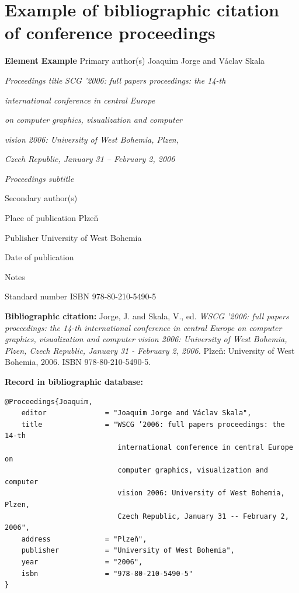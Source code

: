 \newpage
\section*{Example of bibliographic citation of conference proceedings}
\label{pr-sbornik}
\begin{tabbing}
\zarazky
\textbf{Element} \> \textbf{Example} \odradkovani
Primary author(s) \>
Joaquim {\sc Jorge} and Václav {\sc Skala}

\odradkovani
{\em Proceedings title} \>
{\em SCG ’2006: full papers proceedings: the 14-th}

    \odradkovani \>
    {\em international conference in central Europe}
    
    \odradkovani \>
    {\em on computer graphics, visualization and computer}
    
    \odradkovani \>
    {\em vision 2006: University of West Bohemia, Plzen,}

    \odradkovani \>
    {\em Czech Republic, January 31 -- February 2, 2006}

\odradkovani
{\em Proceedings subtitle}\footnotemark[1]

\odradkovani
Secondary author(s)\footnotemark[1] \>

\odradkovani
Place of publication \>
Plzeň

\odradkovani
Publisher \>
University of West Bohemia

\odradkovani
Date of publication 

\odradkovani
Notes\footnotemark[2] \>

\odradkovani
Standard number \>
ISBN 978-80-210-5490-5

\odradkovani
\end{tabbing}

\noindent \textbf{Bibliographic citation:} \odradkovani
{\sc Jorge}, J. and {\sc Skala}, V., ed. {\em WSCG ’2006: full papers proceedings: the 14-th
international conference in central Europe on computer graphics, visualization and
computer vision 2006: University of West Bohemia, Plzen, Czech Republic, January
31 - February 2, 2006.} Plzeň: University of West Bohemia, 2006. ISBN
978-80-210-5490-5.

\bigskip \bigskip
\noindent \textbf{Record in bibliographic database:}
\vspace{-0.5em}
\begin{verbatim}
@Proceedings{Joaquim,
    editor              = "Joaquim Jorge and Václav Skala",
    title               = "WSCG ’2006: full papers proceedings: the 14-th 
                           international conference in central Europe on 
                           computer graphics, visualization and computer 
                           vision 2006: University of West Bohemia, Plzen, 
                           Czech Republic, January 31 -- February 2, 2006",
    address             = "Plzeň",
    publisher           = "University of West Bohemia",
    year                = "2006",
    isbn                = "978-80-210-5490-5"
}
\end{verbatim}

